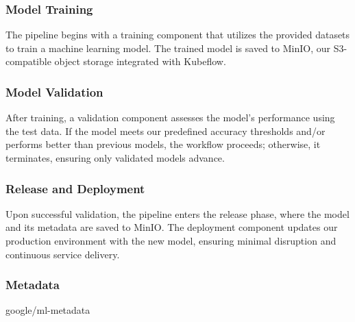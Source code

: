 \subsubsection{Model Training}
The pipeline begins with a training component that utilizes the provided datasets to train a machine learning model.
The trained model is saved to MinIO, our S3-compatible object storage integrated with Kubeflow.

\subsubsection{Model Validation}
After training, a validation component assesses the model's performance using the test data.
If the model meets our predefined accuracy thresholds and/or performs better than previous models,
the workflow proceeds; otherwise, it terminates, ensuring only validated models advance.

\subsubsection{Release and Deployment}
Upon successful validation, the pipeline enters the release phase, where the model and its metadata are saved to MinIO.
The deployment component updates our production environment with the new model, ensuring minimal disruption and continuous service delivery.

\subsubsection{Metadata}
google/ml-metadata